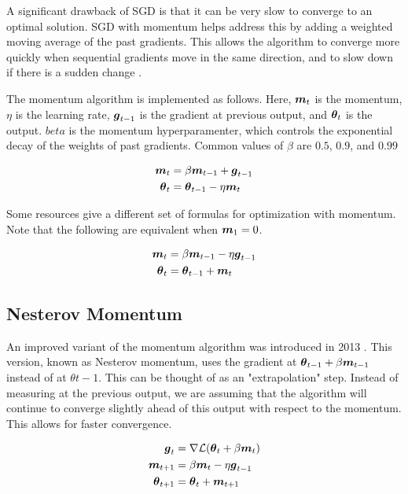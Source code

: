 \documentclass{article}
\begin{document}
A significant drawback of SGD is that it can be very slow to converge to an optimal solution. SGD with momentum helps address this by adding a weighted moving average of the past gradients. This allows the algorithm to converge more quickly when sequential gradients move in the same direction, and to slow down if there is a sudden change \cite{pml1book}. 

The momentum algorithm is implemented as follows. Here, \(\vb*{m}_t\) is the momentum, \(\eta\) is the learning rate, \(\vb*{g}_{t-1}\) is the gradient at previous output, and \(\vb*{\theta}_t\) is the output. \(beta\) is the momentum hyperparamenter, which controls the exponential decay of the weights of past gradients. Common values of \(\beta\) are \(0.5\), \(0.9\), and \(0.99\) \cite{pml1book}



\begin{align*}
    \vb*{m}_t &= \beta \vb*{m}_{t-1} + \vb*{g}_{t-1} \\
    \vb*{\theta}_t &= \vb*{\theta}_{t-1} - \eta \vb*{m}_t
\end{align*}


Some resources give a different set of formulas for optimization with momentum. Note that the following are equivalent when \(\vb*{m}_1 = 0\).

\begin{align*}
    \vb*{m}_t &= \beta \vb*{m}_{t-1} - \eta \vb*{g}_{t-1} \\
    \vb*{\theta}_t &= \vb*{\theta}_{t-1} + \vb*{m}_t
\end{align*}

\subsection{Nesterov Momentum}

An improved variant of the momentum algorithm was introduced in 2013 \cite{sutskever13}. This version, known as Nesterov momentum, uses the gradient at \(\vb*{\theta}_{t-1} + \beta \vb*{m}_{t-1}\) instead of at \(\theta{t-1}\). This can be thought of as an "extrapolation" step. Instead of measuring at the previous output, we are assuming that the algorithm will continue to converge slightly ahead of this output with respect to the momentum. This allows for faster convergence.

\begin{align*}
    \vb*{g}_{t} &= \nabla \mathcal{L} (\vb*{\theta}_{t} + \beta \vb*{m}_{t}) \\
    \vb*{m}_{t+1} &= \beta \vb*{m}_{t} - \eta \vb*{g}_{t-1} \\
    \vb*{\theta}_{t+1} &= \vb*{\theta}_t + \vb*{m}_{t+1}
\end{align*}
\end{document}
